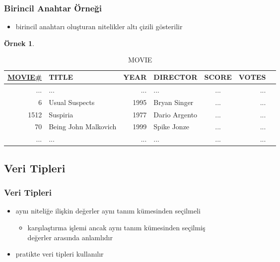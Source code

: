 \documentclass[dvipsnames]{beamer}
\theoremstyle{definition}
\theoremstyle{example}
\newtheorem{ornek}[theorem]{Örnek}
\theoremstyle{plain}
\begin{document}
\begin{frame}
  \frametitle{Birincil Anahtar Örneği}

  \begin{itemize}
    \item birincil anahtarı oluşturan nitelikler altı çizili gösterilir
  \end{itemize}

  \begin{ornek}
    \begin{tiny}
    \begin{table}
      \caption{MOVIE}
      \begin{tabular}{|r|l|r|l|c|r|r|}\hline
\underline{MOVIE\#} & TITLE & YEAR & DIRECTOR      & SCORE & VOTES\\[2pt]\hline\hline
 ... & ...                  &  ... & ...           &   ... &   ...\\\hline
   6 & Usual Suspects       & 1995 & Bryan Singer  &   ... &   ...\\\hline
1512 & Suspiria             & 1977 & Dario Argento &   ... &   ...\\\hline
  70 & Being John Malkovich & 1999 & Spike Jonze   &   ... &   ...\\\hline
 ... & ...                  &  ... & ...           &   ... &   ...\\\hline
      \end{tabular}
    \end{table}
    \end{tiny}
  \end{ornek}
\end{frame}

\subsection{Veri Tipleri}

\begin{frame}
  \frametitle{Veri Tipleri}

  \begin{itemize}
    \item aynı niteliğe ilişkin değerler aynı tanım kümesinden seçilmeli
    \begin{itemize}
      \item karşılaştırma işlemi ancak aynı tanım kümesinden seçilmiş\\
        değerler arasında anlamlıdır
    \end{itemize}

    \pause
    \medskip
    \item pratikte veri tipleri kullanılır
  \end{itemize}
\end{frame}
\end{document}
